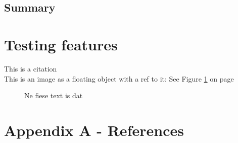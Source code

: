 \documentclass[11p]{scrartcl}
\begin{document}
\subsection{Summary}


\section*{Testing features}
This is a citation \cite{Chang2008}\\
This is an image as a floating object with a ref to it: See Figure \ref{fig:fieseText} on page \pageref{fig:fieseText}
\begin{figure}[h]		
	\caption{Ne fiese text is dat}
	\label{fig:fieseText}
\end{figure}

\section*{Appendix A - References}


\end{document}
